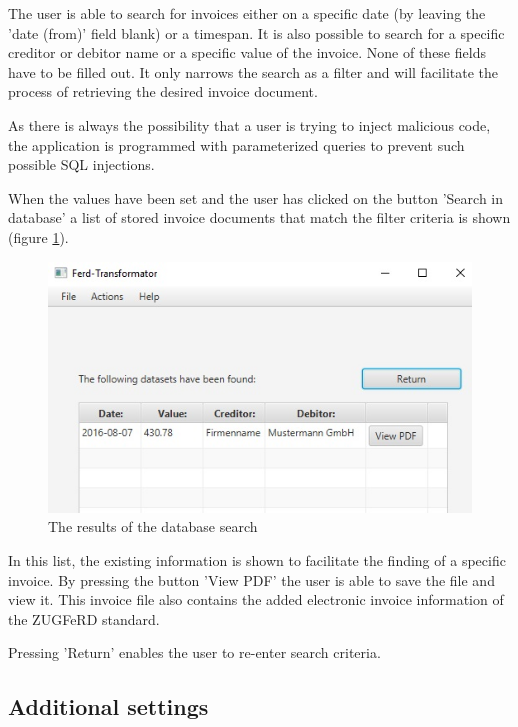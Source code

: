 The user is able to search for invoices either on a specific date (by leaving the 'date (from)' field blank) or a timespan.
It is also possible to search for a specific creditor or debitor name or a specific value of the invoice.
None of these fields have to be filled out. It only narrows the search as a filter and will facilitate the process of retrieving the desired invoice document.

As there is always the possibility that a user is trying to inject malicious code, the application is programmed with parameterized queries to prevent such possible SQL injections.

When the values have been set and the user has clicked on the button 'Search in database' a list of stored invoice documents that match the filter criteria is shown (figure \ref{searchResults}).

\begin{figure}[ht!]
\centering
\includegraphics[scale=0.6]{Images/GUI/SearchResults.jpg}
\caption{The results of the database search \label{searchResults}}
\end{figure}

In this list, the existing information is shown to facilitate the finding of a specific invoice. By pressing the button 'View PDF' the user is able to save the file and view it. This invoice file also contains the added electronic invoice information of the ZUGFeRD standard.

Pressing 'Return' enables the user to re-enter search criteria. 

\subsection{Additional settings}
\label{sec5.8.3}

